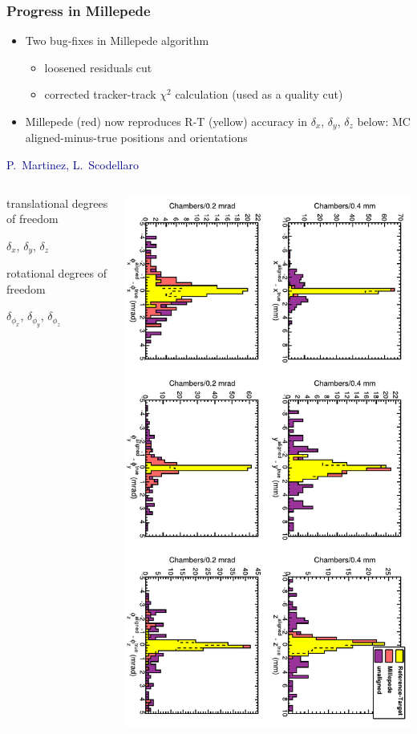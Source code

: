 \documentclass[compress]{beamer}
\begin{document}
\begin{frame}
\frametitle{Progress in Millepede}

\begin{itemize}
\item Two bug-fixes in Millepede algorithm
\begin{itemize}
\item loosened residuals cut
\item corrected tracker-track $\chi^2$ calculation (used as a quality cut)
\end{itemize}
\item Millepede (red) now reproduces R-T (yellow) accuracy in $\delta_x$, $\delta_y$, $\delta_z$ below: MC aligned-minus-true positions and orientations
\end{itemize}

\hfill \textcolor{darkblue}{\scriptsize P.~Martinez, L.~Scodellaro}

\vspace{-0.25 cm}
\begin{columns}
\begin{center}
translational degrees of freedom

$\delta_x$, $\delta_y$, $\delta_z$

\vspace{0.75 cm}
rotational degrees of freedom

$\delta_{\phi_x}$, $\delta_{\phi_y}$, $\delta_{\phi_z}$

\vspace{0.5 cm}
\mbox{ }
\end{center}
\includegraphics[height=\linewidth, angle=90]{hip_MC.pdf}
\end{columns}
\end{frame}
\end{document}
